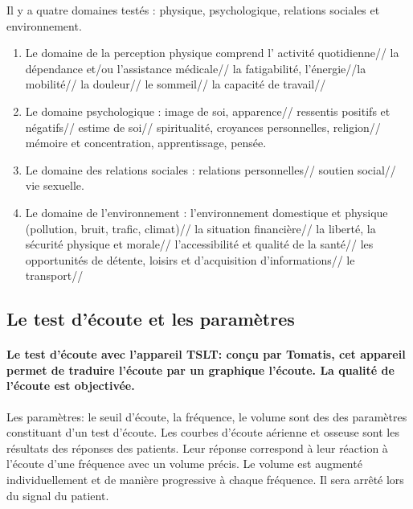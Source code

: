 Il y a quatre domaines testés : physique, psychologique, relations sociales et environnement.
\begin{enumerate}
	\item  Le domaine de la perception physique comprend l' activité quotidienne// la dépendance et/ou l'assistance médicale// la fatigabilité, l'énergie//la mobilité// la douleur// le sommeil// la capacité de travail//
	
		 \item Le domaine psychologique :  image de soi, apparence// ressentis positifs et négatifs// estime de soi// spiritualité, croyances personnelles, religion// mémoire et concentration, apprentissage, pensée.
		
			\item Le domaine des relations sociales : relations personnelles// soutien social// vie sexuelle.
			
			\item Le domaine de l'environnement : l'environnement domestique et  physique (pollution, bruit, trafic, climat)// la situation financière//  la liberté, la sécurité physique et morale// l'accessibilité et qualité de la santé// les opportunités de détente, loisirs et d'acquisition d'informations// le transport// 
		\end{enumerate}
		
	


 \subsection{Le test d'écoute et les paramètres} 	
 
 \paragraph{Le test d'écoute avec l'appareil TSLT: conçu par Tomatis,
   cet appareil permet de traduire l'écoute par 
   un graphique l'écoute. La
   qualité de l'écoute est objectivée.} 
 Les paramètres: le seuil d'écoute, la fréquence, le volume sont des
 des paramètres 
 constituant d'un test d'écoute. Les courbes
 d'écoute aérienne et osseuse sont les résultats des
 réponses des patients. Leur réponse correspond à leur réaction à l'écoute d'une
 fréquence avec un volume précis.
 Le volume est augmenté individuellement et de manière progressive à
 chaque fréquence. Il sera arrêté lors du signal du patient. 
 
